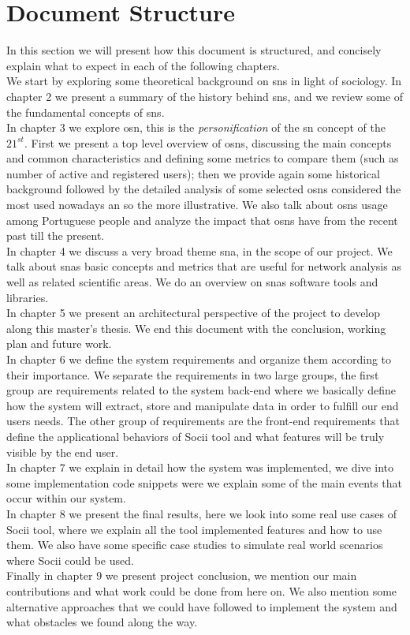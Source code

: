 \section{Document Structure}
In this section we will present how this document is structured, and concisely explain what to expect in each of the following chapters.\\
\indent We start by exploring some theoretical background on \glspl{sn} in light of sociology. In chapter 2 we present a summary of the history behind \glspl{sn}, and we review some of the fundamental concepts of \glspl{sn}.\\
\indent In chapter 3 we explore \acrfull{osn}, this is the \textit{personification} of the \gls{sn} concept of the $21^{st}$. First we present a top level overview of \glspl{osn}, discussing the main concepts and common characteristics and defining some metrics to compare them (such as number of active and registered users); then we provide again some historical background followed by the detailed analysis of some selected \glspl{osn} considered the most used nowadays an so the more illustrative. We also talk about \glspl{osn} usage among Portuguese people and analyze the impact that \glspl{osn} have from the recent past till the present.\\
\indent In chapter 4 we discuss a very broad theme \acrfull{sna}, in the scope of our project. We talk about \glspl{sna} basic concepts and metrics that are useful for network analysis as well as related scientific areas. We do an overview on \glspl{sna} software tools and libraries.\\
\indent In chapter 5 we present an architectural perspective of the project to develop along this master's thesis. We end this document with the conclusion, working plan and future work.\\
\indent In chapter 6 we define the system requirements and organize them according to their importance. We separate the requirements in two large groups, the first group are requirements related to the system back-end where we basically define how the system will extract, store and manipulate data in order to fulfill our end users needs. The other group of requirements are the front-end requirements that define the applicational behaviors of Socii tool and what features will be truly visible by the end user.\\
\indent In chapter 7 we explain in detail how the system was implemented, we dive into some implementation code snippets were we explain some of the main events that occur within our system.\\
\indent In chapter 8 we present the final results, here we look into some real use cases of Socii tool, where we explain all the tool implemented features and how to use them. We also have some specific case studies to simulate real world scenarios where Socii could be used.\\
\indent Finally in chapter 9 we present project conclusion, we mention our main contributions and what work could be done from here on. We also mention some alternative approaches that we could have followed to implement the system and what obstacles we found along the way.
